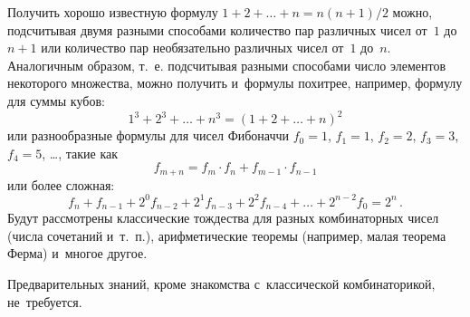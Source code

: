 



Получить хорошо известную формулу $1 + 2 + \ldots + n = n (n + 1) / 2$ можно,
подсчитывая двумя разными способами количество пар различных чисел от~$1$
до~$n + 1$ или количество пар необязательно различных чисел от~$1$ до~$n$.
Аналогичным образом, т.~е. подсчитывая разными способами число элементов
некоторого множества, можно получить и~формулы похитрее, например, формулу для
суммы кубов:
\[
    1^3 + 2^3 + \ldots + n^3
=
    (1 + 2 + \ldots + n)^2
\]
или разнообразные формулы для чисел Фибоначчи
$f_{0} = 1$, $f_{1} = 1$, $f_{2} = 2$, $f_{3} = 3$, $f_{4} = 5$, \ldots,
такие как
\[
    f_{m+n} = f_{m} \cdot f_{n} + f_{m-1} \cdot f_{n-1}
\]
или более сложная:
\[
    f_{n} + f_{n-1} +
    2^{0} f_{n-2} + 2^{1} f_{n-3} + 2^2 f_{n-4} +
    \ldots +
    2^{n-2} f_{0}
=
    2^n
\, . \]
Будут рассмотрены классические тождества для разных комбинаторных чисел
(числа сочетаний и~т.~п.), арифметические теоремы
(например, малая теорема Ферма) и~многое другое.

Предварительных знаний, кроме знакомства с~классической комбинаторикой,
не~требуется.


